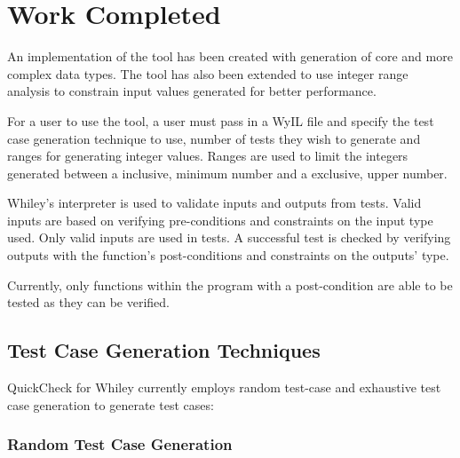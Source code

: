 \chapter{Work Completed}\label{chapter:work}



An implementation of the tool has been created with generation of core and more complex data types. The tool has also been extended to use integer range analysis to constrain input values generated for better performance.

For a user to use the tool, a user must pass in a WyIL file and specify the test case generation technique to use, number of tests they wish to generate and ranges for generating integer values. Ranges are used to limit the integers generated between a inclusive, minimum number and a exclusive, upper number.

Whiley's interpreter is used to validate inputs and outputs from tests. Valid inputs are based on verifying pre-conditions and constraints on the input type used. Only valid inputs are used in tests. A successful test is checked by verifying outputs with the function's post-conditions and constraints on the outputs' type.


Currently, only functions within the program with a post-condition are able to be tested as they can be verified.

\section{Test Case Generation Techniques}

QuickCheck for Whiley currently employs random test-case and exhaustive test case generation to generate test cases: 

\subsection{Random Test Case Generation}

